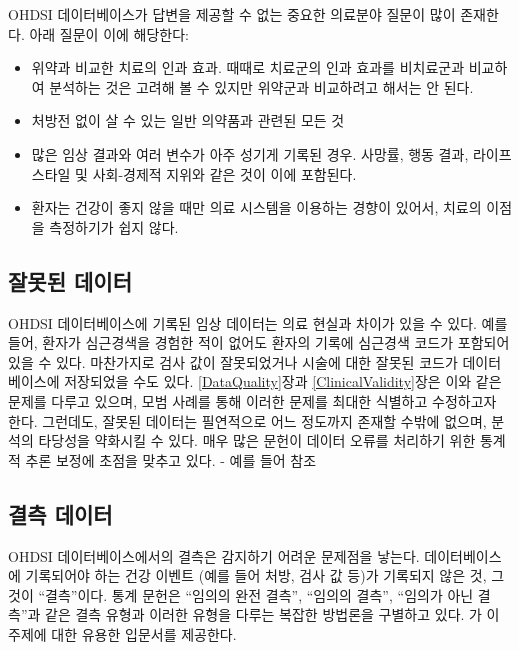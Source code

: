 \documentclass[10.5pt]{book}
\providecommand{\tightlist}{%
  \setlength{\itemsep}{0pt}\setlength{\parskip}{0pt}}
\theoremstyle{definition}
\theoremstyle{definition}
\theoremstyle{definition}
\theoremstyle{remark}
\begin{document}

OHDSI 데이터베이스가 답변을 제공할 수 없는 중요한 의료분야 질문이 많이
존재한다. 아래 질문이 이에 해당한다:

\begin{itemize}
\tightlist
\item
  위약과 비교한 치료의 인과 효과. 때때로 치료군의 인과 효과를 비치료군과
  비교하여 분석하는 것은 고려해 볼 수 있지만 위약군과 비교하려고 해서는
  안 된다.
\item
  처방전 없이 살 수 있는 일반 의약품과 관련된 모든 것
\item
  많은 임상 결과와 여러 변수가 아주 성기게 기록된 경우. 사망률, 행동
  결과, 라이프 스타일 및 사회-경제적 지위와 같은 것이 이에 포함된다.
\item
  환자는 건강이 좋지 않을 때만 의료 시스템을 이용하는 경향이 있어서,
  치료의 이점을 측정하기가 쉽지 않다.
\end{itemize}

\subsection{잘못된 데이터}\label{-}

OHDSI 데이터베이스에 기록된 임상 데이터는 의료 현실과 차이가 있을 수
있다. 예를 들어, 환자가 심근경색을 경험한 적이 없어도 환자의 기록에
심근경색 코드가 포함되어 있을 수 있다. 마찬가지로 검사 값이 잘못되었거나
시술에 대한 잘못된 코드가 데이터베이스에 저장되었을 수도 있다.
\ref{DataQuality}장과 \ref{ClinicalValidity}장은 이와 같은 문제를 다루고
있으며, 모범 사례를 통해 이러한 문제를 최대한 식별하고 수정하고자 한다.
그런데도, 잘못된 데이터는 필연적으로 어느 정도까지 존재할 수밖에 없으며,
분석의 타당성을 약화시킬 수 있다. 매우 많은 문헌이 데이터 오류를
처리하기 위한 통계적 추론 보정에 초점을 맞추고 있다. - 예를 들어
\citet{fuller2009measurement} 참조

\subsection{결측 데이터}\label{-}


OHDSI 데이터베이스에서의 결측은 감지하기 어려운 문제점을 낳는다.
데이터베이스에 기록되어야 하는 건강 이벤트 (예를 들어 처방, 검사 값
등)가 기록되지 않은 것, 그것이 ``결측''이다. 통계 문헌은 ``임의의 완전
결측'', ``임의의 결측'', ``임의가 아닌 결측''과 같은 결측 유형과 이러한
유형을 다루는 복잡한 방법론을 구별하고 있다.
\citet{perkins2017principled} 가 이 주제에 대한 유용한 입문서를
제공한다.
\end{document}
